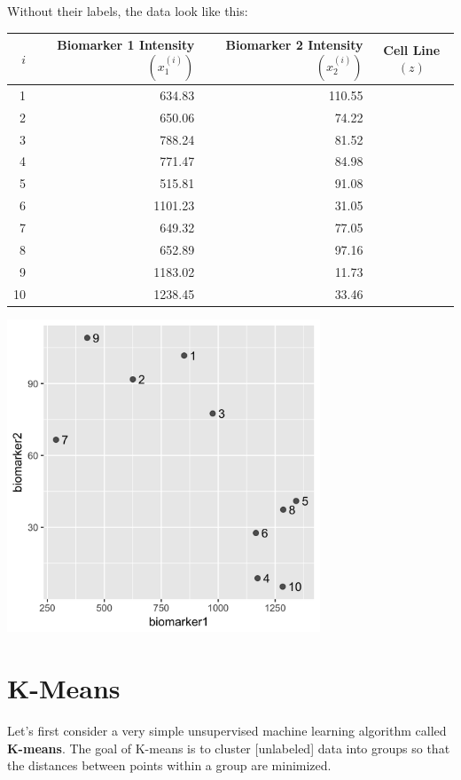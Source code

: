 \vspace{5mm}

\noindent Without their labels, the data look like this:

\begin{center}
\begin{tabular}{rrrc}
  \toprule
$i$ & Biomarker 1 Intensity $(x_1^{(i)})$ & Biomarker 2 Intensity $(x_2^{(i)})$ & Cell Line $(z)$ \\
  \midrule
1 & 634.83 & 110.55 \\ 
  2 & 650.06 & 74.22 \\ 
  3 & 788.24 & 81.52 \\ 
  4 & 771.47 & 84.98 \\ 
  5 & 515.81 & 91.08 \\ 
  6 & 1101.23 & 31.05 \\ 
  7 & 649.32 & 77.05 \\ 
  8 & 652.89 & 97.16 \\ 
  9 & 1183.02 & 11.73 \\ 
  10 & 1238.45 & 33.46 \\ 
   \bottomrule
\end{tabular}
\includegraphics[width=0.7\textwidth]{img/biomarker-data-labels.png}
\end{center}


\section{K-Means}

Let's first consider a very simple unsupervised machine learning algorithm called \textbf{K-means}. The goal of K-means is to cluster [unlabeled] data into groups so that the distances between points within a group are minimized.

